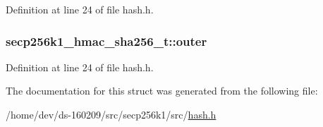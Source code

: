 Definition at line 24 of file hash.\+h.

\hypertarget{structsecp256k1__hmac__sha256__t_a3974e44471231d09a8d282ef62e0b77a}{}
\subsubsection[{outer}]{ secp256k1\+\_\+hmac\+\_\+sha256\+\_\+t\+::outer}\label{structsecp256k1__hmac__sha256__t_a3974e44471231d09a8d282ef62e0b77a}


Definition at line 24 of file hash.\+h.



The documentation for this struct was generated from the following file\+:\begin{DoxyCompactItemize}
\item 
/home/dev/ds-\/160209/src/secp256k1/src/\hyperlink{secp256k1_2src_2hash_8h}{hash.\+h}\end{DoxyCompactItemize}
